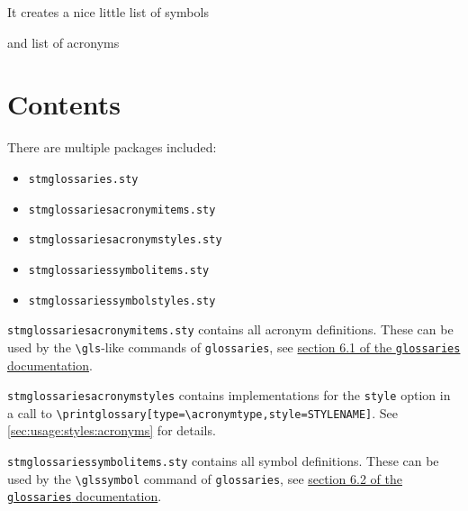 \documentclass{scrartcl}
\begin{document}
It creates a nice little list of symbols

\glstocfalse
\printglossary[type=example1list  ,style=stmsymbolstyle  ,nonumberlist]
\glstoctrue

and list of acronyms

\glstocfalse
\printglossary[type=\acronymtype,style=stmacronymstyle,nonumberlist]
\glstoctrue

\section{Contents}
\label{sec:contents}

There are multiple packages included:

\begin{itemize}[noitemsep]
  \item \texttt{stmglossaries.sty}
  \item \texttt{stmglossariesacronymitems.sty}
  \item \texttt{stmglossariesacronymstyles.sty}
  \item \texttt{stmglossariessymbolitems.sty}
  \item \texttt{stmglossariessymbolstyles.sty}
\end{itemize}

\texttt{stmglossariesacronymitems.sty} contains all acronym definitions. These can be used by the \texttt{\textbackslash gls}-like commands of \texttt{glossaries}, see \href{http://ftp.fau.de/ctan/macros/latex/contrib/glossaries/glossaries-user.pdf#section.6.1}{section 6.1 of the \texttt{glossaries} documentation}.

\texttt{stmglossariesacronymstyles} contains implementations for the \texttt{style} option in a call to \verb+\printglossary[type=\acronymtype,style=STYLENAME]+. See \autoref{sec:usage:styles:acronyms} for details.

\texttt{stmglossariessymbolitems.sty} contains all symbol definitions. These can be used by the \texttt{\textbackslash glssymbol} command of \texttt{glossaries}, see \href{http://ftp.fau.de/ctan/macros/latex/contrib/glossaries/glossaries-user.pdf#section.6.2}{section 6.2 of the \texttt{glossaries} documentation}.
\end{document}
